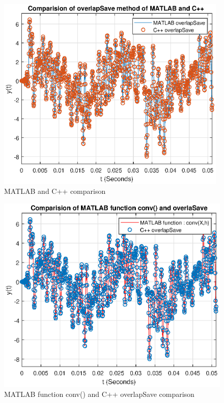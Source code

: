 \begin{refsection}
\begin{figure}[h]
	\centering
	\includegraphics[width=11cm]{./algorithms/overlap_save/figures/randomNoise_matlab_and_C++.eps}
	\caption{MATLAB and C++ comparison}\label{randomNoise_matlab_and_C++}
\end{figure}

\begin{figure}[h]
	\centering
	\includegraphics[width=12cm]{./algorithms/overlap_save/figures/randomNoise_conv_and_C++.eps}
	\caption{MATLAB function conv() and C++ overlapSave comparison}\label{randomNoise_conv_and_C++}
\end{figure}


\end{refsection}
